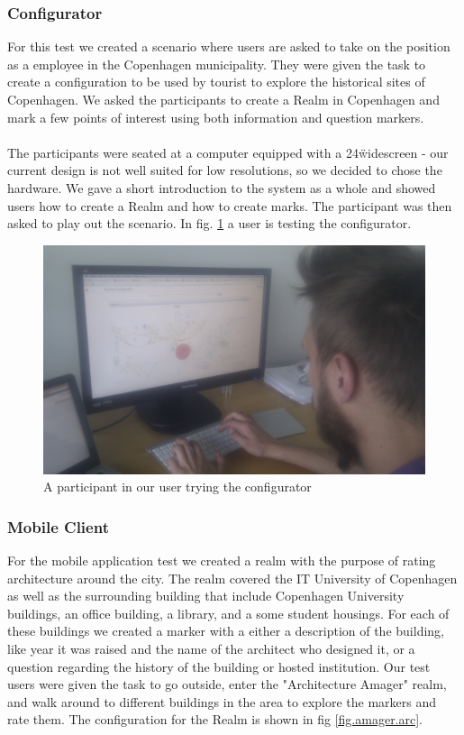 \subsubsection{Configurator} %
\label{sub:configuration_manager_evaluation}
For this test we created a scenario where users are asked to take on the position as a employee in the Copenhagen municipality. They were given the task to create a configuration to be used by tourist to explore the historical sites of Copenhagen. We asked the participants to create a Realm in Copenhagen and mark a few points of interest using both information and question markers.
\\\\
The participants were seated at a computer equipped with a 24\" widescreen - our current design is not well suited for low resolutions, so we decided to chose the hardware. We gave a short introduction to the system as a whole and showed users how to create a Realm and how to create marks. The participant was then asked to play out the scenario. In fig. \ref{fig:testing} a user is testing the configurator.

\begin{figure}
	\centering
	\includegraphics[scale=0.14]{fig/testing}
	\caption{A participant in our user trying the configurator}
	\label{fig:testing}
\end{figure}

\subsubsection{Mobile Client} %
\label{sub:android_application_evaluation}
For the mobile application test we created a realm with the purpose of rating architecture around the city. The realm covered the IT University of Copenhagen as well as the surrounding building that include Copenhagen University buildings, an office building, a library, and a some student housings. For each of these buildings we created a marker with a either a description of the building, like year it was raised and the name of the architect who designed it, or a question regarding the history of the building or hosted institution. Our test users were given the task to go outside, enter the "Architecture Amager" realm, and walk around to different buildings in the area to explore the markers and rate them. The configuration for the Realm is shown in fig \ref{fig.amager.arc}.

